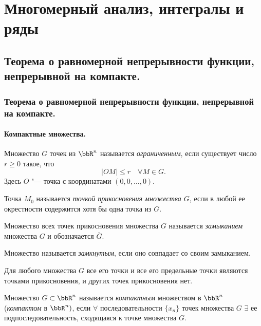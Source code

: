 \part{Многомерный анализ, интегралы и ряды}

\chapter[Теорема о равномерной непрерывности функции, непрерывной на компакте.]{Теорема о равномерной непрерывности функции, непрерывной на компакте.}

\section{Теорема о равномерной непрерывности функции, непрерывной на компакте.}

\subsection{Компактные множества.}

\begin{defn}
Множество $G$ точек из $\bbR ^n$ называется \textit{ограниченным}, если существует число $r\ge 0$ такое, что
$$
|OM|\le r \quad \forall M\in G.
$$
Здесь $O$ "--- точка с координатами $(0,0,\dots,0)$.
\end{defn}

\begin{defn}
Точка $M_0$ называется \textit{точкой прикосновения множества $G$}, если в любой ее окрестности содержится хотя бы одна точка из $G$.
\end{defn}

\begin{defn}
Множество всех точек прикосновения множества $G$ называется \textit{замыканием} множества $G$ и обозначается $\overline{G}$.
\end{defn}

\begin{defn}
Множество называется \textit{замкнутым}, если оно совпадает со своим замыканием.
\end{defn}

Для любого множества $G$ все его точки и все его предельные точки являются точками прикосновения, и других точек прикосновения нет.

\begin{defn}
Множество $G \subset \bbR^n$ называется \textit{компактным} множеством в $\bbR^n$ (\textit{компактом} в $\bbR^n)$, если $\forall$ последовательности $\{ x_n \}$ точек множества $G$ $\exists$ ее подпоследовательность, сходящаяся к точке множества $G$.
\end{defn}

